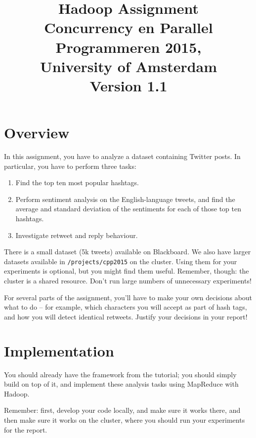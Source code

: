 \documentclass[a4paper,10pt]{article}
\date{}
\title{Hadoop Assignment\\
  Concurrency en Parallel Programmeren 2015,\\
  University of Amsterdam\\
  Version 1.1
}
\begin{document}
  \maketitle
  
  \tableofcontents
  
  \section{Overview}
  
  In this assignment, you have to analyze a dataset containing Twitter posts. In particular, you have to perform three tasks:

  \begin{enumerate}
    \item Find the top ten most popular hashtags.
    \item Perform sentiment analysis on the English-language tweets, and find the average and standard deviation of the sentiments for each of those top ten hashtags.
    \item Investigate retweet and reply behaviour.
  \end{enumerate}

  There is a small dataset (5k tweets) available on Blackboard. We also have larger datasets available in \texttt{/projects/cpp2015} on the cluster. Using them for your experiments is optional, but you might find them useful. Remember, though: the cluster is a shared resource. Don't run large numbers of unnecessary experiments!

  For several parts of the assignment, you'll have to make your own decisions about what to do -- for example, which characters you will accept as part
  of hash tags, and how you will detect identical retweets. Justify your decisions in your report!

  \section{Implementation}

  You should already have the framework from the tutorial; you should simply build on top of it, and implement these analysis tasks using MapReduce with Hadoop.
  
  Remember: first, develop your code locally, and make sure it works there, and then make sure it works on the cluster, where you should run your experiments
  for the report.
  
\end{document}
